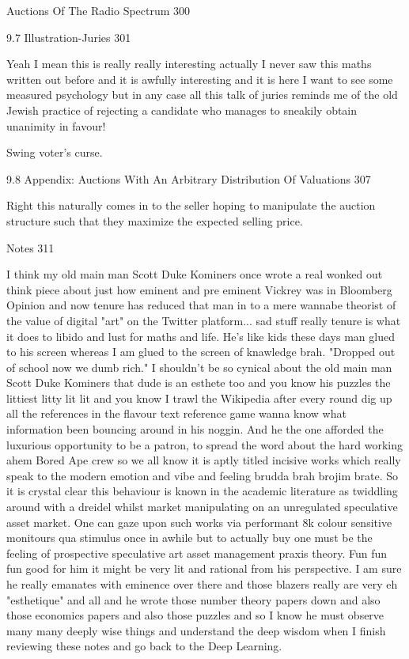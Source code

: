 Auctions Of The Radio Spectrum 300



9.7 Illustration-Juries 301

Yeah I mean this is really really interesting actually I never saw this maths written out before and it is awfully interesting and it is here I want to see some measured psychology but in any case all this talk of juries reminds me of the old Jewish practice of rejecting a candidate who manages to sneakily obtain unanimity in favour!

Swing voter's curse.

9.8 Appendix: Auctions With An Arbitrary Distribution Of Valuations 307

Right this naturally comes in to the seller hoping to manipulate the auction structure such that they maximize the expected selling price.

Notes 311

I think my old main man Scott Duke Kominers once wrote a real wonked out think piece about just how eminent and pre eminent Vickrey was in Bloomberg Opinion and now tenure has reduced that man in to a mere wannabe theorist of the value of digital "art" on the Twitter platform... sad stuff really tenure is what it does to libido and lust for maths and life. He's like kids these days man glued to his screen whereas I am glued to the screen of knawledge brah. "Dropped out of school now we dumb rich." I shouldn't be so cynical about the old main man Scott Duke Kominers that dude is an esthete too and you know his puzzles the littiest litty lit lit and you know I trawl the Wikipedia after every round dig up all the references in the flavour text reference game wanna know what information been bouncing around in his noggin. And he the one afforded the luxurious opportunity to be a patron, to spread the word about the hard working ahem Bored Ape crew so we all know it is aptly titled incisive works which really speak to the modern emotion and vibe and feeling brudda brah brojim brate. So it is crystal clear this behaviour is known in the academic literature as twiddling around with a dreidel whilst market manipulating on an unregulated speculative asset market. One can gaze upon such works via performant 8k colour sensitive monitours qua stimulus once in awhile but to actually buy one must be the feeling of prospective speculative art asset management praxis theory. Fun fun fun good for him it might be very lit and rational from his perspective. I am sure he really emanates with eminence over there and those blazers really are very eh "esthetique" and all and he wrote those number theory papers down and also those economics papers and also those puzzles and so I know he must observe many many deeply wise things and understand the deep wisdom when I finish reviewing these notes and go back to the Deep Learning.


